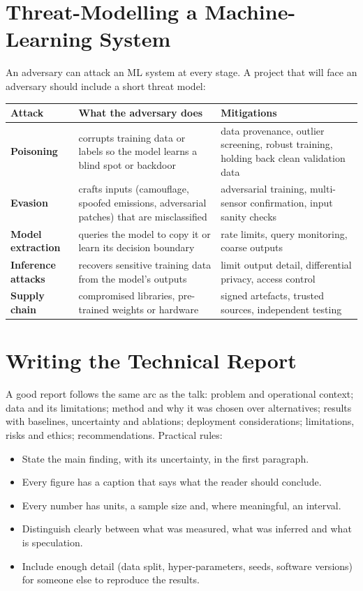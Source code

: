 \documentclass[11pt]{article}
\begin{document}
\section{Threat-Modelling a Machine-Learning System}
An adversary can attack an ML system at every stage. A project that will face an adversary should include a short threat model:
\begin{center}\small\renewcommand{\arraystretch}{1.3}\begin{tabularx}{\textwidth}{>{\bfseries}l X X}\toprule Attack & What the adversary does & Mitigations\\\midrule
Poisoning & corrupts training data or labels so the model learns a blind spot or backdoor & data provenance, outlier screening, robust training, holding back clean validation data\\
Evasion & crafts inputs (camouflage, spoofed emissions, adversarial patches) that are misclassified & adversarial training, multi-sensor confirmation, input sanity checks\\
Model extraction & queries the model to copy it or learn its decision boundary & rate limits, query monitoring, coarse outputs\\
Inference attacks & recovers sensitive training data from the model's outputs & limit output detail, differential privacy, access control\\
Supply chain & compromised libraries, pre-trained weights or hardware & signed artefacts, trusted sources, independent testing\\\bottomrule\end{tabularx}\end{center}

\section{Writing the Technical Report}
A good report follows the same arc as the talk: problem and operational context; data and its limitations; method and why it was chosen over alternatives; results with baselines, uncertainty and ablations; deployment considerations; limitations, risks and ethics; recommendations. Practical rules:
\begin{itemize}
\item State the main finding, with its uncertainty, in the first paragraph.
\item Every figure has a caption that says what the reader should conclude.
\item Every number has units, a sample size and, where meaningful, an interval.
\item Distinguish clearly between what was measured, what was inferred and what is speculation.
\item Include enough detail (data split, hyper-parameters, seeds, software versions) for someone else to reproduce the results.
\end{itemize}
\end{document}
